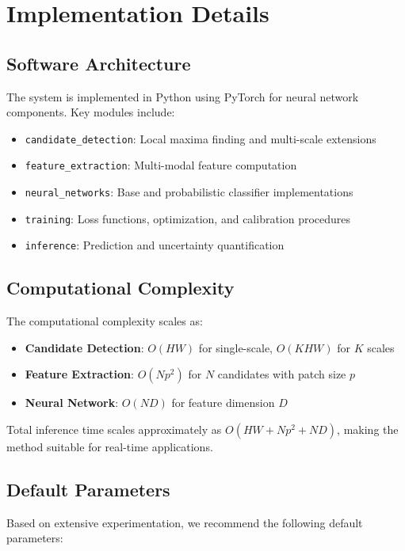 \documentclass[twocolumn,10pt]{aastex631}
\begin{document}
\section{Implementation Details}

\subsection{Software Architecture}
The system is implemented in Python using PyTorch for neural network components. Key modules include:

\begin{itemize}
\item \texttt{candidate\_detection}: Local maxima finding and multi-scale extensions
\item \texttt{feature\_extraction}: Multi-modal feature computation
\item \texttt{neural\_networks}: Base and probabilistic classifier implementations
\item \texttt{training}: Loss functions, optimization, and calibration procedures
\item \texttt{inference}: Prediction and uncertainty quantification
\end{itemize}

\subsection{Computational Complexity}
The computational complexity scales as:
\begin{itemize}
\item \textbf{Candidate Detection}: $O(HW)$ for single-scale, $O(KHW)$ for $K$ scales
\item \textbf{Feature Extraction}: $O(Np^2)$ for $N$ candidates with patch size $p$
\item \textbf{Neural Network}: $O(ND)$ for feature dimension $D$
\end{itemize}

Total inference time scales approximately as $O(HW + Np^2 + ND)$, making the method suitable for real-time applications.

\subsection{Default Parameters}
Based on extensive experimentation, we recommend the following default parameters:
\end{document}
